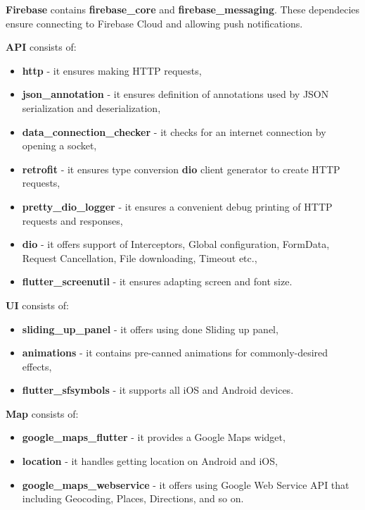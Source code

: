 \textbf{Firebase} contains \textbf{firebase\_core} and \textbf{firebase\_messaging}.
These dependecies ensure connecting to Firebase Cloud and allowing push notifications.

\textbf{API} consists of:
\begin{itemize}
    \item \textbf{http} - it ensures making HTTP requests,
    \item \textbf{json\_annotation} - it ensures definition of annotations used by JSON serialization and deserialization,
    \item \textbf{data\_connection\_checker} - it checks for an internet connection by opening a socket,
    \item \textbf{retrofit} - it ensures type conversion \textbf{dio} client generator to create HTTP requests,
    \item \textbf{pretty\_dio\_logger} - it ensures a convenient debug printing of HTTP requests and responses,
    \item \textbf{dio} - it offers support of Interceptors, Global configuration, FormData, Request Cancellation, File downloading, Timeout etc.,
    \item \textbf{flutter\_screenutil} - it ensures adapting screen and font size.
\end{itemize}

\textbf{UI} consists of:
\begin{itemize}
    \item \textbf{sliding\_up\_panel} - it offers using done Sliding up panel,
    \item \textbf{animations} - it contains pre-canned animations for commonly-desired effects,
    \item \textbf{flutter\_sfsymbols} - it supports all iOS and Android devices.
\end{itemize}

\textbf{Map} consists of:
\begin{itemize}
    \item \textbf{google\_maps\_flutter} - it provides a Google Maps widget,
    \item \textbf{location} - it handles getting location on Android and iOS,
    \item \textbf{google\_maps\_webservice} - it offers using Google Web Service API that including Geocoding, Places, Directions, and so on.
\end{itemize}

